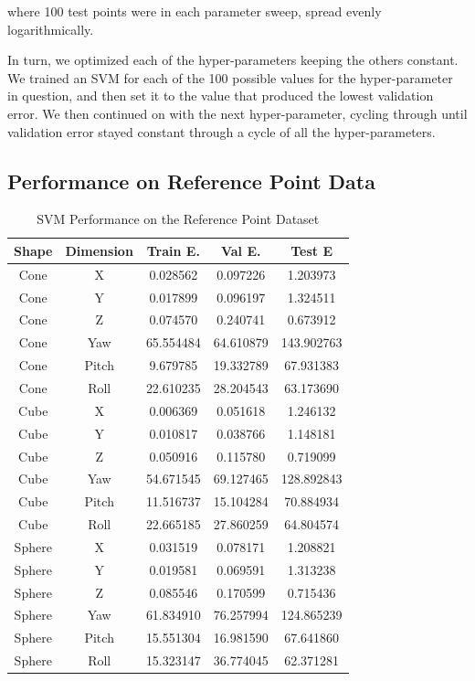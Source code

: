 \documentclass[journal]{IEEEtran}
\begin{document}
\noindent where 100 test points were in each parameter sweep, spread evenly logarithmically.

In turn, we optimized each of the hyper-parameters keeping the others constant. We trained an SVM for each of the 100 possible values for the hyper-parameter in question, and then set it to the value that produced the lowest validation error. We then continued on with the next hyper-parameter, cycling through until validation error stayed constant through a cycle of all the hyper-parameters.

\subsection{Performance on Reference Point Data}

\begin{table}[h]
\caption{SVM Performance on the Reference Point Dataset}
\label{SVM_Point}
\centering
	\begin{tabular}{|c|c|c|c|c|}
	\hline
	Shape & Dimension & Train E. & Val E. & Test E\\
   \hline
    Cone &X & 0.028562 & 0.097226 & 1.203973 \\
    Cone &Y & 0.017899 & 0.096197 & 1.324511 \\
    Cone &Z & 0.074570 & 0.240741 & 0.673912 \\
    Cone &Yaw & 65.554484 & 64.610879 & 143.902763 \\
    Cone &Pitch & 9.679785 & 19.332789 & 67.931383 \\
    Cone &Roll & 22.610235 & 28.204543 & 63.173690 \\
    \hline
    Cube & X & 0.006369 & 0.051618 & 1.246132 \\
    Cube & Y & 0.010817 & 0.038766 & 1.148181 \\
    Cube & Z & 0.050916 & 0.115780 & 0.719099 \\
    Cube & Yaw & 54.671545 & 69.127465 & 128.892843 \\
    Cube & Pitch & 11.516737 & 15.104284 & 70.884934 \\
    Cube & Roll & 22.665185 & 27.860259 & 64.804574 \\
    \hline
    Sphere & X & 0.031519 & 0.078171 & 1.208821 \\
    Sphere & Y & 0.019581 & 0.069591 & 1.313238 \\
    Sphere & Z & 0.085546 & 0.170599 & 0.715436\\
    Sphere & Yaw & 61.834910 & 76.257994 & 124.865239 \\
    Sphere & Pitch & 15.551304 & 16.981590 & 67.641860 \\
    Sphere & Roll & 15.323147 & 36.774045 & 62.371281 \\
    \hline
	\end{tabular}
\end{table}
\end{document}

